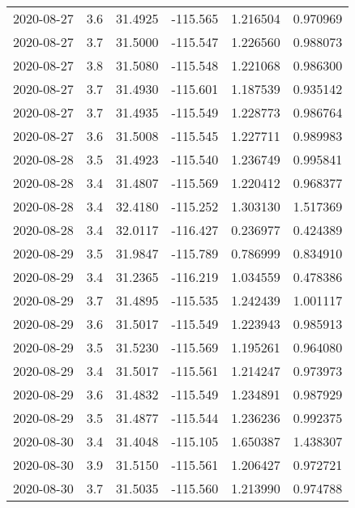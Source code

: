 \begin{tabular}{lrrrrr}
2020-08-27 &       3.6 &  31.4925 &  -115.565 &         1.216504 &         0.970969 \\
2020-08-27 &       3.7 &  31.5000 &  -115.547 &         1.226560 &         0.988073 \\
2020-08-27 &       3.8 &  31.5080 &  -115.548 &         1.221068 &         0.986300 \\
2020-08-27 &       3.7 &  31.4930 &  -115.601 &         1.187539 &         0.935142 \\
2020-08-27 &       3.7 &  31.4935 &  -115.549 &         1.228773 &         0.986764 \\
2020-08-27 &       3.6 &  31.5008 &  -115.545 &         1.227711 &         0.989983 \\
2020-08-28 &       3.5 &  31.4923 &  -115.540 &         1.236749 &         0.995841 \\
2020-08-28 &       3.4 &  31.4807 &  -115.569 &         1.220412 &         0.968377 \\
2020-08-28 &       3.4 &  32.4180 &  -115.252 &         1.303130 &         1.517369 \\
2020-08-28 &       3.4 &  32.0117 &  -116.427 &         0.236977 &         0.424389 \\
2020-08-29 &       3.5 &  31.9847 &  -115.789 &         0.786999 &         0.834910 \\
2020-08-29 &       3.4 &  31.2365 &  -116.219 &         1.034559 &         0.478386 \\
2020-08-29 &       3.7 &  31.4895 &  -115.535 &         1.242439 &         1.001117 \\
2020-08-29 &       3.6 &  31.5017 &  -115.549 &         1.223943 &         0.985913 \\
2020-08-29 &       3.5 &  31.5230 &  -115.569 &         1.195261 &         0.964080 \\
2020-08-29 &       3.4 &  31.5017 &  -115.561 &         1.214247 &         0.973973 \\
2020-08-29 &       3.6 &  31.4832 &  -115.549 &         1.234891 &         0.987929 \\
2020-08-29 &       3.5 &  31.4877 &  -115.544 &         1.236236 &         0.992375 \\
2020-08-30 &       3.4 &  31.4048 &  -115.105 &         1.650387 &         1.438307 \\
2020-08-30 &       3.9 &  31.5150 &  -115.561 &         1.206427 &         0.972721 \\
2020-08-30 &       3.7 &  31.5035 &  -115.560 &         1.213990 &         0.974788 \\

\end{tabular}
